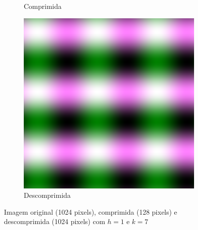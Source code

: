 \documentclass{article}
\begin{document}
\begin{figure}[ht]
\begin{subfigure}{0.3\textwidth}
    \caption{Comprimida}
  \end{subfigure}%
  \hfill
  \begin{subfigure}{0.3\textwidth}
    \centering
    \includegraphics[width=\textwidth]{senoidal/decompress3vezes/decompressed-7.png}
    \caption{Descomprimida}
  \end{subfigure}%
  \caption{Imagem original (1024 pixels), comprimida (128 pixels) e descomprimida (1024 pixels) com $h=1$ e $k=7$}
\end{figure}
\end{document}
